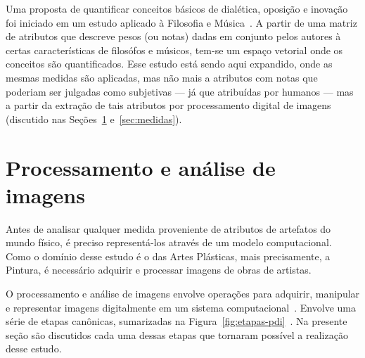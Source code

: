 Uma proposta de quantificar conceitos básicos de dialética, oposição e
inovação foi iniciado em um estudo aplicado à Filosofia e
Música~\cite{vieira}. A partir de uma matriz de atributos que descreve
pesos (ou notas) dadas em conjunto pelos autores à certas
características de filosófos e músicos, tem-se um espaço vetorial onde
os conceitos são quantificados. Esse estudo está sendo aqui expandido,
onde as mesmas medidas são aplicadas, mas não mais a atributos com
notas que poderiam ser julgadas como subjetivas --- já que atribuídas
por humanos --- mas a partir da extração de tais atributos por
processamento digital de imagens (discutido nas
Seções~\ref{sec:fund:imagens} e~\ref{sec:medidas}).

\section{Processamento e análise de imagens}
\label{sec:fund:imagens}

Antes de analisar qualquer medida proveniente de atributos de
artefatos do mundo físico, é preciso representá-los através de um
modelo computacional. Como o domínio desse estudo é o das Artes
Plásticas, mais precisamente, a Pintura, é necessário adquirir e
processar imagens de obras de artistas.

O processamento e análise de imagens envolve operações para adquirir,
manipular e representar imagens digitalmente em um sistema
computacional~\cite{gonzalez}. Envolve uma série de etapas canônicas,
sumarizadas na Figura~\ref{fig:etapas-pdi}~\cite{luciano}. Na presente
seção são discutidos cada uma dessas etapas que tornaram possível a
realização desse estudo.

